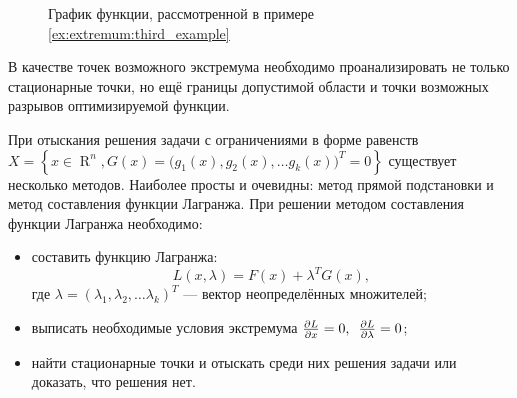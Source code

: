 \documentclass[preprint,russian,a5paper,10pt,twoside,mediummath]{ncc}
\begin{document}
\begin{figure}[ht] \centering
{}
\footnotesize \caption{График функции, рассмотренной в примере \ref{ex:extremum:third_example} \label{fig:extremum:third_example}}
\end{figure}

В качестве точек возможного экстремума необходимо проанализировать не только стационарные точки, но ещё границы допустимой области и точки возможных разрывов оптимизируемой функции.

При отыскания решения задачи с ограничениями в форме равенств $ X=\left\{ x \in \mathop{R}^n, G \left( x \right) = { \bigl( g_1(x), g_2(x),\ldots g_k(x) \bigr) }^T = 0 \right\} $ существует несколько методов. Наиболее просты и очевидны: метод прямой подстановки и метод составления функции Лагранжа. При решении методом составления функции Лагранжа необходимо:
\begin{itemize}
\item составить функцию Лагранжа:
\begin{equation}\label{equ:extremum:Lagrange}
L \left( x, \lambda \right) = F \left( x \right) + \lambda ^T G\left( x \right) ,
\end{equation}
где $ \lambda = { \left( \lambda _1, \lambda _2,\ldots \lambda _k \right) }^T $ --- вектор неопределённых множителей;
\item выписать необходимые условия экстремума $ \frac{\partial L}{\partial x} = 0, \enskip \frac{\partial L}{\partial \lambda } = 0 $;
\item найти стационарные точки и отыскать среди них решения задачи или доказать, что решения нет.
\end{itemize}
\end{document}

